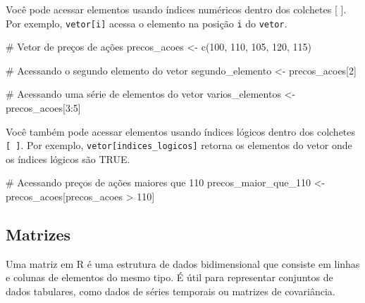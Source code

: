 \documentclass[
  portuguese,
  letterpaper,
  DIV=11,
  numbers=noendperiod]{scrreprt}
\newenvironment{Shaded}{\begin{snugshade}}{\end{snugshade}}
\newcommand{\CommentTok}[1]{\textcolor[rgb]{0.37,0.37,0.37}{#1}}
\newcommand{\DecValTok}[1]{\textcolor[rgb]{0.68,0.00,0.00}{#1}}
\newcommand{\FunctionTok}[1]{\textcolor[rgb]{0.28,0.35,0.67}{#1}}
\newcommand{\NormalTok}[1]{\textcolor[rgb]{0.00,0.23,0.31}{#1}}
\newcommand{\OtherTok}[1]{\textcolor[rgb]{0.00,0.23,0.31}{#1}}
\newcommand{\SpecialCharTok}[1]{\textcolor[rgb]{0.37,0.37,0.37}{#1}}
\theoremstyle{definition}
\theoremstyle{remark}
\begin{document}
Você pode acessar elementos usando índices numéricos dentro dos
colchetes {[} {]}. Por exemplo, \texttt{vetor{[}i{]}} acessa o elemento
na posição \texttt{i} do \texttt{vetor}.

\begin{Shaded}
\begin{Highlighting}[]
\CommentTok{\# Vetor de preços de ações}
\NormalTok{precos\_acoes }\OtherTok{\textless{}{-}} \FunctionTok{c}\NormalTok{(}\DecValTok{100}\NormalTok{, }\DecValTok{110}\NormalTok{, }\DecValTok{105}\NormalTok{, }\DecValTok{120}\NormalTok{, }\DecValTok{115}\NormalTok{)}

\CommentTok{\# Acessando o segundo elemento do vetor}
\NormalTok{segundo\_elemento }\OtherTok{\textless{}{-}}\NormalTok{ precos\_acoes[}\DecValTok{2}\NormalTok{]}

\CommentTok{\# Acessando uma série de elementos do vetor}
\NormalTok{varios\_elementos }\OtherTok{\textless{}{-}}\NormalTok{ precos\_acoes[}\DecValTok{3}\SpecialCharTok{:}\DecValTok{5}\NormalTok{]}
\end{Highlighting}
\end{Shaded}

Você também pode acessar elementos usando índices lógicos dentro dos
colchetes \texttt{{[}\ {]}}. Por exemplo,
\texttt{vetor{[}indices\_logicos{]}} retorna os elementos do vetor onde
os índices lógicos são TRUE.

\begin{Shaded}
\begin{Highlighting}[]
\CommentTok{\# Acessando preços de ações maiores que 110}
\NormalTok{precos\_maior\_que\_110 }\OtherTok{\textless{}{-}}\NormalTok{ precos\_acoes[precos\_acoes }\SpecialCharTok{\textgreater{}} \DecValTok{110}\NormalTok{]}
\end{Highlighting}
\end{Shaded}

\subsection{Matrizes}\label{matrizes}

Uma matriz em R é uma estrutura de dados bidimensional que consiste em
linhas e colunas de elementos do mesmo tipo. É útil para representar
conjuntos de dados tabulares, como dados de séries temporais ou matrizes
de covariância.
\end{document}
